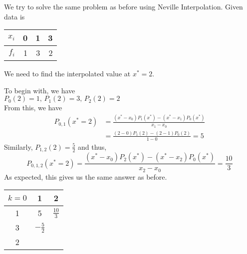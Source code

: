 \begin{example}
	We try to solve the same problem as before using Neville Interpolation. Given data is
	\begin{center}
		\begin{tabular}{|r||r|r|r|}
			\hline
			$x_i$ & 0 & 1 & 3 \\
			\hline
			$f_i$ & 1 & 3 & 2 \\
			\hline
		\end{tabular}
	\end{center}
	We need to find the interpolated value at $x^* = 2$.
\end{example}

\begin{soln}
	To begin with, we have\\
	$P_0(2) = 1 \text{, } P_1(2) = 3 \text{, } P_2(2) = 2$\\
	From this, we have
	\begin{equation}
		\begin{split}
			P_{0,1}(x^*=2) &= \frac{(x^*-x_0)P_1(x^*)-(x^*-x_1)P_0(x^*)}{x_1 - x_0} \\
			&= \frac{(2-0)P_1(2)-(2-1)P_0(2)}{1 - 0} = 5
		\end{split}
	\end{equation}
	Similarly, $P_{1,2}(2) = \frac{5}{2}$ and thus,
	$$P_{0,1,2}(x^* = 2) = \frac{(x^*-x_0)P_2(x^*)-(x^*-x_2)P_0(x^*)}{x_2 - x_0} = \frac{10}{3}$$
	As expected, this gives us the same answer as before.

	\begin{center}
		\begin{tabular}{|ccc|}
			\hline
			$k = 0$ & 1              & 2              \\
			\hline
			1       & 5              & $\frac{10}{3}$ \\
			3       & $-\frac{5}{2}$ &                \\
			2       &                &                \\

			\hline
		\end{tabular}
	\end{center}
\end{soln}